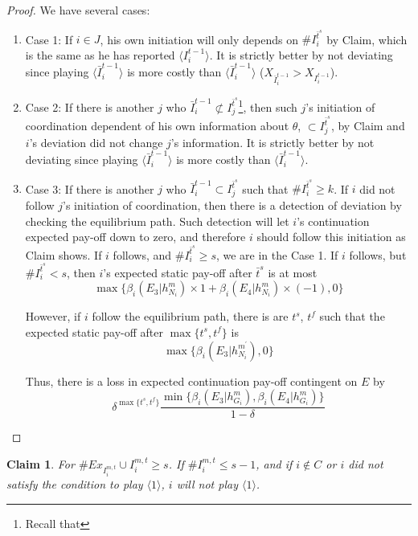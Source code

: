 \documentclass[12pt]{article}
\newtheorem{claim}{Claim}[subsubsection]
\theoremstyle{remark}
\theoremstyle{remark}
\begin{document}
\begin{proof}
We have several cases:
\begin{enumerate}
\item Case 1: If $i\in J$, his own initiation will only depends on $\# I^{\bar{t}^s}_i$ by Claim, which is the same as he has reported $\langle {I}^{t-1}_i\rangle$. It is strictly better by not deviating since playing $\langle\bar{I}^{t-1}_i\rangle$ is more costly than $\langle\bar{I}^{t-1}_i\rangle$ ($X_{\bar{I}^{t-1}_i}>X_{I^{t-1}_i}$).
\item Case 2: If there is another $j$ who $\bar{I}^{t-1}_i\not\subset I^{\bar{t}^{s}}_j$\footnote{Recall that }, then such $j$'s initiation of coordination dependent of his own information about $\theta$, $\subset I^{\bar{t}^{s}}_j$, by Claim and $i$'s deviation did not change $j$'s information. It is strictly better by not deviating since playing $\langle\bar{I}^{t-1}_i\rangle$ is more costly than $\langle\bar{I}^{t-1}_i\rangle$.
\item Case 3: If there is another $j$ who $\bar{I}^{t-1}_i\subset {I}^{\bar{t}^{s}}_j$ such that $\# I^{\bar{t}^s}_i\geq k$. If $i$ did not follow $j$'s initiation of coordination, then there is a detection of deviation by checking the equilibrium path. Such detection will let $i$'s continuation expected pay-off down to zero, and therefore $i$ should follow this initiation as Claim shows. If $i$ follows, and $\#I^{\bar{t}^s}_i\geq s$, we are in the Case 1. If $i$ follows, but $\#I^{\bar{t}^s}_i< s$, then $i$'s expected static pay-off after $\bar{t}^{s}$ is at most
\[
{\max\{\beta_{i}(E_3|h^{m}_{N_i})\times 1+\beta_{i}(E_4|h^{m}_{N_i})\times (-1), 0\}}
\]

However, if $i$ follow the equilibrium path, there is are $t^s$, $t^f$ such that the expected static pay-off after $\max\{t^s,t^f\}$ is
\[\max\{\beta_{i}(E_3|h^{m^{'}}_{N_i}),0\}\]

Thus, there is a loss in expected continuation pay-off contingent on $E$ by
\[\delta^{\max\{t^s,t^f\}}\frac{\min\{\beta_{i}(E_3|h^{m}_{G_i}),\beta_{i}(E_4|h^{m}_{G_i})\}}{1-\delta}\]
\end{enumerate}


\end{proof}



\begin{claim} 
\label{claim_can_not_pretend_almost_success}
For $\#Ex_{I^{m,t}_i}\cup I^{m,t}_i\geq s$. If $\#I^{m,t}_i\leq s-1$, and if $i\notin C$ or $i$ did not satisfy the condition to play $\langle 1 \rangle$, $i$ will not play $\langle 1 \rangle$.
\end{claim}
\end{document}
